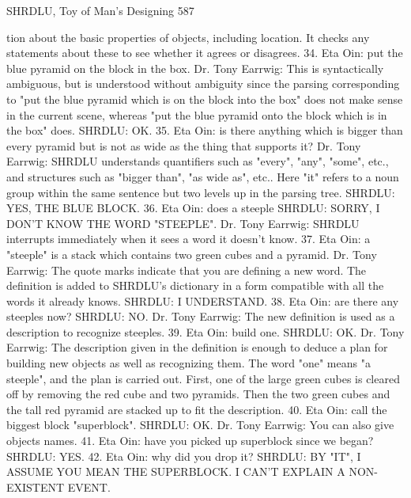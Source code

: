 {SHRDLU, Toy of Man's Designing                                                        587

        tion about the basic properties of objects, including location. It checks any
        statements about these to see whether it agrees or disagrees.
34. Eta Oin: put the blue pyramid on the block in the box.
        Dr. Tony Earrwig: This is syntactically ambiguous, but is understood without
        ambiguity since the parsing corresponding to "put the blue pyramid which is
        on the block into the box" does not make sense in the current scene, whereas
        "put the blue pyramid onto the block which is in the box" does. SHRDLU: OK.
35. Eta Oin: is there anything which is bigger than every pyramid but is not as wide as
        the thing that supports it?
        Dr. Tony Earrwig: SHRDLU understands quantifiers such as "every", "any",
        "some", etc., and structures such as "bigger than", "as wide as", etc.. Here "it"
        refers to a noun group within the same sentence but two levels up in the parsing
        tree.
        SHRDLU: YES, THE BLUE BLOCK.
36. Eta Oin: does a steeple
        SHRDLU: SORRY, I DON'T KNOW THE WORD "STEEPLE".
        Dr. Tony Earrwig: SHRDLU interrupts immediately when it sees a word it doesn't
        know.
37. Eta Oin: a "steeple" is a stack which contains two green cubes and a pyramid.
        Dr. Tony Earrwig: The quote marks indicate that you are defining a new word.
        The definition is added to SHRDLU's dictionary in a form compatible with all the
        words it already knows.
        SHRDLU: I UNDERSTAND.
38. Eta Oin: are there any steeples now?
        SHRDLU: NO.
        Dr. Tony Earrwig: The new definition is used as a description to recognize
        steeples.
39. Eta Oin: build one.
        SHRDLU: OK.
        Dr. Tony Earrwig: The description given in the definition is enough to deduce a
        plan for building new objects as well as recognizing them. The word "one" means
        "a steeple", and the plan is carried out. First, one of the large green cubes is
        cleared off by removing the red cube and two pyramids. Then the two green cubes
        and the tall red pyramid are stacked up to fit the description.
40. Eta Oin: call the biggest block "superblock".
        SHRDLU: OK.
        Dr. Tony Earrwig: You can also give objects names.
41. Eta Oin: have you picked up superblock since we began?
        SHRDLU: YES.
42. Eta Oin: why did you drop it?
        SHRDLU: BY "IT", I ASSUME YOU MEAN THE SUPERBLOCK. I CAN'T
        EXPLAIN A NON-EXISTENT EVENT.




}
